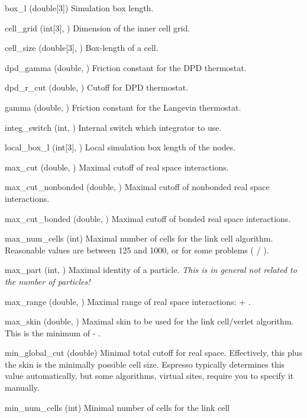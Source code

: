 \begin{globvar}
\item[box_l] (double[3]) Simulation box length.
\item[cell_grid] (int[3], \ro) Dimension of the inner
  cell grid.
\item[cell_size] (double[3], \ro) Box-length of a cell.
\item[dpd_gamma] (double, \ro) Friction constant for the
  DPD thermostat.
\item[dpd_r_cut] (double, \ro) Cutoff for DPD thermostat.
\item[gamma] (double, \ro) Friction constant for the
  Langevin thermostat.
\item[integ_switch] (int, \ro) Internal switch which integrator to
  use.
\item[local_box_l] (int[3], \ro) Local simulation box length of the
  nodes.
\item[max_cut] (double, \ro) Maximal cutoff of real space
  interactions.
\item[max_cut_nonbonded] (double, \ro) Maximal cutoff of nonbonded
  real space interactions.
\item[max_cut_bonded] (double, \ro) Maximal cutoff of bonded
  real space interactions.
\item[max_num_cells] (int) Maximal number of cells for the link cell
  algorithm.  Reasonable values are between 125 and 1000, or for some
  problems ( / ).
\item[max_part] (int, \ro) Maximal identity of a particle.
  \emph{This is in general not related to the number of particles!}
\item[max_range] (double, \ro) Maximal range of real space
  interactions:  + .
\item[max_skin] (double, \ro) Maximal skin to be used for the link
  cell/verlet algorithm. This is the minimum of  -
  .
\item[min_global_cut] (double) Minimal total cutoff for real space.
  Effectively, this plus the skin is the minimally possible cell size.
  Espresso typically determines this value automatically, but some
  algorithms, \eg{} virtual sites, require you to specify it manually.
\item[min_num_cells] (int) Minimal number of cells for the link cell

\end{globvar}
